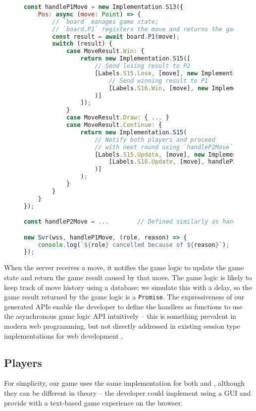 \begin{figure}[!h]
\begin{lstlisting}[language=javascript,tabsize=2]
const handleP1Move = new Implementation.S13({
	Pos: async (move: Point) => {
		// `board` manages game state;
		// `board.P1` registers the move and returns the game result
		const result = await board.P1(move);
		switch (result) {
			case MoveResult.Win: {
				return new Implementation.S15([
					// Send losing result to P2
					[Labels.S15.Lose, [move], new Implementation.S16(
						// Send winning result to P1
						[Labels.S16.Win, [move], new Implementation.Terminal()]
					)]
				]);
			}
			case MoveResult.Draw: { ... }
			case MoveResult.Continue: {
				return new Implementation.S15(
					// Notify both players and proceed
					// with next round using `handleP2Move`
					[Labels.S15.Update, [move], new Implementation.S18(
						[Labels.S18.Update, [move], handleP2Move]
					)]
				);	
			}		
		}
	}
});

const handleP2Move = ...		// Defined similarly as handleP1Move

new Svr(wss, handleP1Move, (role, reason) => {
	console.log(`${role} cancelled because of ${reason}`);
});
\end{lstlisting}
\label{lst:gamesvr}
\end{figure}

When the server receives a move, it notifies
the game logic to update the game state and return the game
result caused by that move.
The game logic is likely to keep track of move history
using a database; we simulate this with a delay, so 
the game result returned by the game logic is a \texttt{Promise}.
The expressiveness of our generated APIs enable the developer
to define the handlers as  functions
to use the asynchronous game logic API intuitively -- this is something
prevalent in modern web programming, but not directly addressed in existing
session type implementations for web development \cite{PureScript2019,MVU2020}.

\subsection{Players}
For simplicity, our game uses the same implementation for both
 and , although they can be different in theory --
the developer could implement  using a GUI and provide
 with a text-based game experience on the browser.

